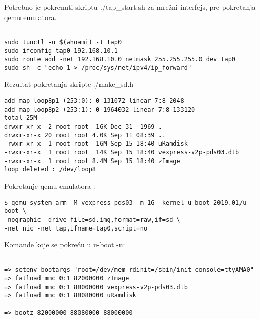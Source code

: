\documentclass{article}
\begin{document}
Potrebno je pokrenuti skriptu ./tap\_start.sh za mrežni interfejs, pre pokretanja qemu emulatora.

\begin{file}
\begin{verbatim}

sudo tunctl -u $(whoami) -t tap0
sudo ifconfig tap0 192.168.10.1
sudo route add -net 192.168.10.0 netmask 255.255.255.0 dev tap0
sudo sh -c "echo 1 > /proc/sys/net/ipv4/ip_forward"

\end{verbatim}
\end{file}

Rezultat pokretanja skripte ./make\_sd.h 




\begin{commandline}
  \begin{verbatim}
add map loop8p1 (253:0): 0 131072 linear 7:8 2048
add map loop8p2 (253:1): 0 1964032 linear 7:8 133120
total 25M
drwxr-xr-x  2 root root  16K Dec 31  1969 .
drwxr-xr-x 20 root root 4.0K Sep 11 08:39 ..
-rwxr-xr-x  1 root root  16M Sep 15 18:40 uRamdisk
-rwxr-xr-x  1 root root  14K Sep 15 18:40 vexpress-v2p-pds03.dtb
-rwxr-xr-x  1 root root 8.4M Sep 15 18:40 zImage
loop deleted : /dev/loop8
  \end{verbatim}
\end{commandline}

Pokretanje qemu emulatora :

\begin{commandline}
  \begin{verbatim}
$ qemu-system-arm -M vexpress-pds03 -m 1G -kernel u-boot-2019.01/u-boot \
-nographic -drive file=sd.img,format=raw,if=sd \
-net nic -net tap,ifname=tap0,script=no
  \end{verbatim}
\end{commandline}

Komande koje se pokreću u u-boot -u:

\begin{commandline}
  \begin{verbatim}

=> setenv bootargs "root=/dev/mem rdinit=/sbin/init console=ttyAMA0"
=> fatload mmc 0:1 82000000 zImage
=> fatload mmc 0:1 88000000 vexpress-v2p-pds03.dtb
=> fatload mmc 0:1 88080000 uRamdisk

=> bootz 82000000 88080000 88000000

  \end{verbatim}
\end{commandline}
\end{document}
